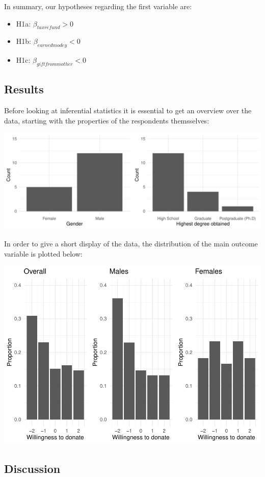 \documentclass[
  12pt,
]{article}
\providecommand{\tightlist}{%
  \setlength{\itemsep}{0pt}\setlength{\parskip}{0pt}}
\begin{document}
In summary, our hypotheses regarding the first variable are:

\begin{itemize}
\tightlist
\item
  H1a: \(\beta_{taxrefund} > 0\)
\item
  H1b: \(\beta_{earnedmodey} < 0\)
\item
  H1c: \(\beta_{giftfrommother} < 0\)
\end{itemize}

\hypertarget{results}{%
\subsection{Results}\label{results}}

Before looking at inferential statistics it is essential to get an
overview over the data, starting with the properties of the respondents
themsselves:

\includegraphics[width=1.05\linewidth]{FSE_paper_files/figure-latex/unnamed-chunk-2-1}

In order to give a short display of the data, the distribution of the
main outcome variable is plotted below:

\includegraphics{FSE_paper_files/figure-latex/plotting_proportions-1.pdf}

\hypertarget{discussion}{%
\subsection{Discussion}\label{discussion}}
\end{document}
